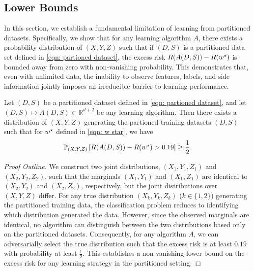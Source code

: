 \subsection{Lower Bounds}

In this section, we establish a fundamental limitation of learning from partitioned datasets. Specifically, we show that for any learning algorithm $A$, there exists a probability distribution of $(X, Y, Z)$ such that if $(D,S)$ is a partitioned data set  defined in \eqref{eqn: partioned dataset}, the excess risk $R(A(D,S)) - R(w^\star)$ is bounded away from zero with non-vanishing probability. This demonstrates that, even with unlimited data, the inability to observe features, labels, and side information jointly imposes an irreducible barrier to learning performance.

\begin{thm}\label{thm: Lower bound on excess risk}
    Let $(D,S)$ be a partitioned dataset defined in \eqref{eqn: partioned dataset}, and let $(D,S) \mapsto A(D,S) \subset \mathbb{R}^{d+2}$ be any learning algorithm.
    Then there exists a distribution of $(X, Y, Z)$ generating the partioned training datasets $(D,S)$ such that for $w^\star$ defined in \eqref{eqn: w star}, we have
    \begin{equation}
        \mathbb{P}_{(X,Y,Z)}\left[R(A(D,S)) - R(w^\star) > 0.19\right] \geq \frac{1}{2}.
    \end{equation}
\end{thm}

\begin{proof}[Proof Outline]
We construct two joint distributions, $(X_1, Y_1, Z_1)$ and $(X_2, Y_2, Z_2)$, such that the marginals $(X_1, Y_1)$ and $(X_1, Z_1)$ are identical to $(X_2, Y_2)$ and $(X_2, Z_2)$, respectively, but the joint distributions over $(X, Y, Z)$ differ. For any true distribution $(X_k, Y_k, Z_k)$ ($k \in \{1,2\}$) generating the partitioned training data, the classification problem reduces to identifying which distribution generated the data. However, since the observed marginals are identical, no algorithm can distinguish between the two distributions based only on the partitioned datasets. Consequently, for any algorithm $A$, we can adversarially select the true distribution such that the excess risk is at least $0.19$ with probability at least $\frac{1}{2}$. This establishes a non-vanishing lower bound on the excess risk for any learning strategy in the partitioned setting.
\end{proof}

